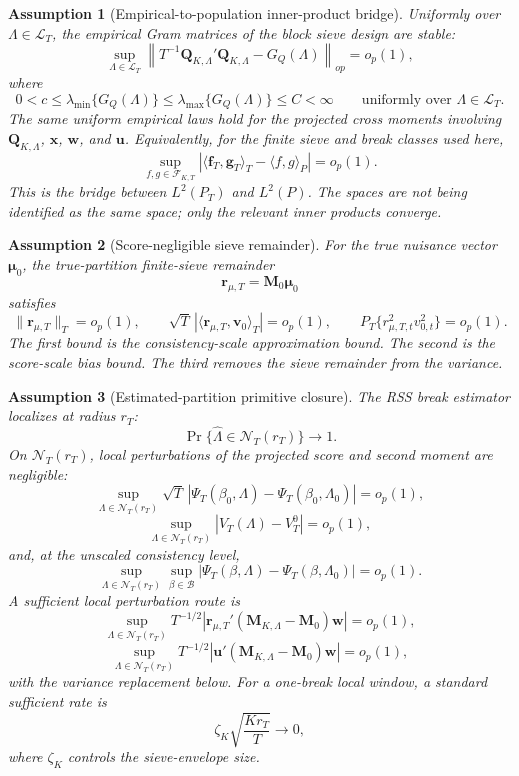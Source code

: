 \documentclass[12pt]{article}
\numberwithin{equation}{section}
\newtheorem{assumption}{Assumption}
\theoremstyle{definition}
\newcommand{\op}{o_p}
\newcommand{\innerT}[2]{\langle #1,#2\rangle_T}
\newcommand{\innerP}[2]{\langle #1,#2\rangle_P}
\begin{document}
\begin{assumption}[Empirical-to-population inner-product bridge]
\label{ass:gram-stability}
Uniformly over \(\Lambda\in\mathcal L_T\), the empirical Gram matrices of the
block sieve design are stable:
\[
    \sup_{\Lambda\in\mathcal L_T}
    \left\|T^{-1}\bm Q_{K,\Lambda}'\bm Q_{K,\Lambda}-G_Q(\Lambda)\right\|_{op}
    =\op(1),
\]
where
\[
    0<c\le \lambda_{\min}\{G_Q(\Lambda)\}
    \le \lambda_{\max}\{G_Q(\Lambda)\}\le C<\infty
    \qquad \text{uniformly over }\Lambda\in\mathcal L_T.
\]
The same uniform empirical laws hold for the projected cross moments involving
\(\bm Q_{K,\Lambda}\), \(\bm x\), \(\bm w\), and \(\bm u\). Equivalently, for
the finite sieve and break classes used here,
\[
    \sup_{f,g\in\mathcal F_{K,T}}
    |\innerT{\bm f_T}{\bm g_T}-\innerP{f}{g}|=\op(1).
\]
This is the bridge between \(L^2(P_T)\) and \(L^2(P)\). The spaces are not being
identified as the same space; only the relevant inner products converge.
\end{assumption}

\begin{assumption}[Score-negligible sieve remainder]
\label{ass:score-negligible-sieve-remainder}
For the true nuisance vector \(\bm\mu_0\), the true-partition finite-sieve
remainder
\[
    \bm r_{\mu,T}=\bm M_0\bm\mu_0
\]
satisfies
\[
    \|\bm r_{\mu,T}\|_T=\op(1),
    \qquad
    \sqrt T\,|\innerT{\bm r_{\mu,T}}{\bm v_0}|=\op(1),
    \qquad
    P_T\{r_{\mu,T,t}^2v_{0,t}^2\}=\op(1).
\]
The first bound is the consistency-scale approximation bound. The second is the
score-scale bias bound. The third removes the sieve remainder from the variance.
\end{assumption}

\begin{assumption}[Estimated-partition primitive closure]
\label{ass:directional-break-replacement}
The RSS break estimator localizes at radius \(r_T\):
\[
    \Pr\{\widehat\Lambda\in\mathcal N_T(r_T)\}\to1.
\]
On \(\mathcal N_T(r_T)\), local perturbations of the projected score and second
moment are negligible:
\[
    \sup_{\Lambda\in\mathcal N_T(r_T)}
    \sqrt T\,|\Psi_T(\beta_0,\Lambda)-\Psi_T(\beta_0,\Lambda_0)|=\op(1),
\]
\[
    \sup_{\Lambda\in\mathcal N_T(r_T)}
    |V_T(\Lambda)-V_T^0|=\op(1),
\]
and, at the unscaled consistency level,
\[
    \sup_{\Lambda\in\mathcal N_T(r_T)}\sup_{\beta\in\mathcal B}
    |\Psi_T(\beta,\Lambda)-\Psi_T(\beta,\Lambda_0)|=\op(1).
\]
A sufficient local perturbation route is
\[
    \sup_{\Lambda\in\mathcal N_T(r_T)}
    T^{-1/2}|\bm r_{\mu,T}'(\bm M_{K,\Lambda}-\bm M_0)\bm w|=\op(1),
\]
\[
    \sup_{\Lambda\in\mathcal N_T(r_T)}
    T^{-1/2}|\bm u'(\bm M_{K,\Lambda}-\bm M_0)\bm w|=\op(1),
\]
with the variance replacement below. For a one-break local window, a standard
sufficient rate is
\[
    \zeta_K\sqrt{\frac{Kr_T}{T}}\to0,
\]
where \(\zeta_K\) controls the sieve-envelope size.
\end{assumption}
\end{document}
